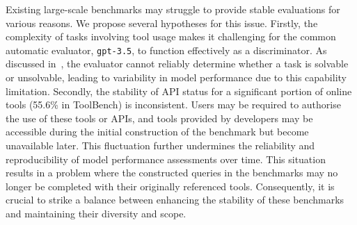 

Existing large-scale benchmarks may struggle to provide stable evaluations for various reasons. We propose several hypotheses for this issue.
Firstly, the complexity of tasks involving tool usage makes it challenging for the common automatic evaluator, \texttt{gpt-3.5}, to function effectively as a discriminator. As discussed in~, the evaluator cannot reliably determine whether a task is solvable or unsolvable, leading to variability in model performance due to this capability limitation.
Secondly, the stability of API status for a significant portion of online tools (55.6\% in ToolBench) is inconsistent. Users may be required to authorise the use of these tools or APIs, and tools provided by developers may be accessible during the initial construction of the benchmark but become unavailable later. This fluctuation further undermines the reliability and reproducibility of model performance assessments over time.
This situation results in a problem where the constructed queries in the benchmarks may no longer be completed with their originally referenced tools. Consequently, it is crucial to strike a balance between enhancing the stability of these benchmarks and maintaining their diversity and scope.




